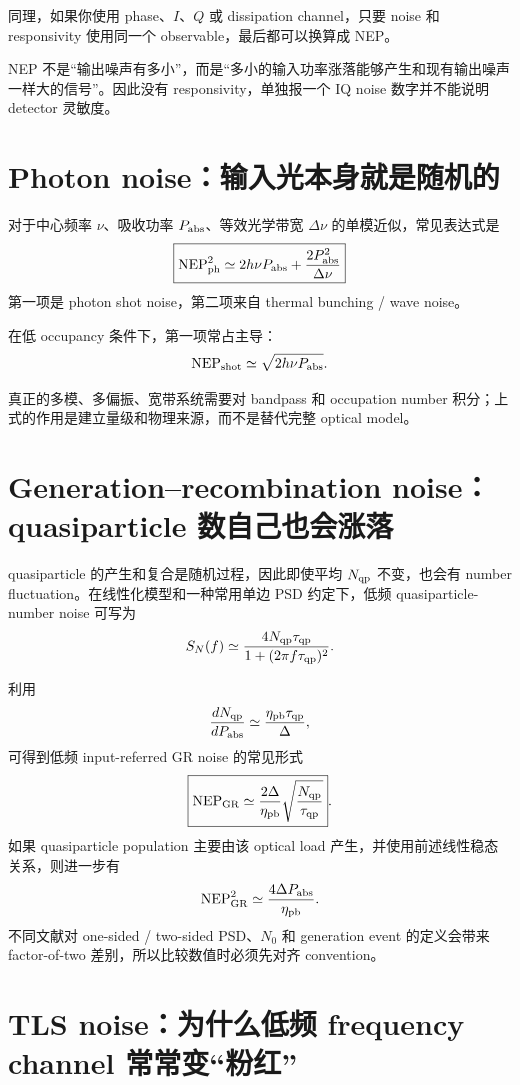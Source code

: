 \documentclass[11pt,a4paper,openany]{ctexrep}
\begin{document}
同理，如果你使用 phase、$I$、$Q$ 或 dissipation channel，只要 noise 和 responsivity 使用同一个 observable，最后都可以换算成 NEP。

\begin{intuitionbox}
NEP 不是“输出噪声有多小”，而是“多小的输入功率涨落能够产生和现有输出噪声一样大的信号”。因此没有 responsivity，单独报一个 IQ noise 数字并不能说明 detector 灵敏度。
\end{intuitionbox}

\section{Photon noise：输入光本身就是随机的}

对于中心频率 $\nu$、吸收功率 $P_{\rm abs}$、等效光学带宽 $\Delta\nu$ 的单模近似，常见表达式是
\[
\boxed{
\mathrm{NEP}_{\rm ph}^2
\simeq
2h\nu P_{\rm abs}
+
\frac{2P_{\rm abs}^2}{\Delta\nu}
}
\]
第一项是 photon shot noise，第二项来自 thermal bunching / wave noise。

在低 occupancy 条件下，第一项常占主导：
\[
\mathrm{NEP}_{\rm shot}
\simeq
\sqrt{2h\nu P_{\rm abs}}.
\]

真正的多模、多偏振、宽带系统需要对 bandpass 和 occupation number 积分；上式的作用是建立量级和物理来源，而不是替代完整 optical model。

\section{Generation--recombination noise：quasiparticle 数自己也会涨落}

quasiparticle 的产生和复合是随机过程，因此即使平均 $N_{\rm qp}$ 不变，也会有 number fluctuation。在线性化模型和一种常用单边 PSD 约定下，低频 quasiparticle-number noise 可写为
\[
S_N(f)
\simeq
\frac{4N_{\rm qp}\tau_{\rm qp}}
{1+(2\pi f\tau_{\rm qp})^2}.
\]

利用
\[
\frac{dN_{\rm qp}}{dP_{\rm abs}}
\simeq
\frac{\eta_{\rm pb}\tau_{\rm qp}}{\Delta},
\]
可得到低频 input-referred GR noise 的常见形式
\[
\boxed{
\mathrm{NEP}_{\rm GR}
\simeq
\frac{2\Delta}{\eta_{\rm pb}}
\sqrt{\frac{N_{\rm qp}}{\tau_{\rm qp}}}
}.
\]
如果 quasiparticle population 主要由该 optical load 产生，并使用前述线性稳态关系，则进一步有
\[
\mathrm{NEP}_{\rm GR}^2
\simeq
\frac{4\Delta P_{\rm abs}}{\eta_{\rm pb}}.
\]
不同文献对 one-sided / two-sided PSD、$N_0$ 和 generation event 的定义会带来 factor-of-two 差别，所以比较数值时必须先对齐 convention。

\section{TLS noise：为什么低频 frequency channel 常常变“粉红”}
\end{document}
